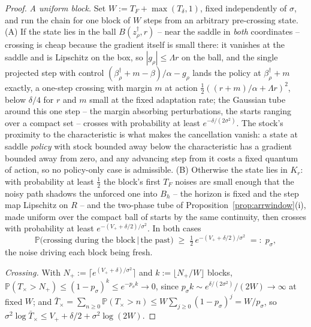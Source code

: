 \documentclass[11pt]{article}
\theoremstyle{definition}
\theoremstyle{remark}
\numberwithin{equation}{section}
\begin{document}
\begin{proof}
\emph{A uniform block.} Set $W := T_F + \max(T_\delta, 1)$, fixed independently of $\sigma$, and run the chain for one block of $W$ steps from an arbitrary pre-crossing state. (A) If the state lies in the ball $B(z^\dagger_\rho, r)$ -- near the saddle in \emph{both} coordinates -- crossing is cheap because the gradient itself is small there: it vanishes at the saddle and is Lipschitz on the box, so $|g_\rho| \le \Lambda r$ on the ball, and the single projected step with control $(\beta^\dagger_\rho + m - \beta)/\alpha - g_\rho$ lands the policy at $\beta^\dagger_\rho + m$ exactly, a one-step crossing with margin $m$ at action $\tfrac12((r+m)/\alpha + \Lambda r)^2$, below $\delta/4$ for $r$ and $m$ small at the fixed adaptation rate; the Gaussian tube around this one step -- the margin absorbing perturbations, the starts ranging over a compact set -- crosses with probability at least $e^{-\delta/(2\sigma^2)}$. The stock's proximity to the characteristic is what makes the cancellation vanish: a state at saddle \emph{policy} with stock bounded away below the characteristic has a gradient bounded away from zero, and any advancing step from it costs a fixed quantum of action, so no policy-only case is admissible. (B) Otherwise the state lies in $K_r$: with probability at least $\tfrac12$ the block's first $T_F$ noises are small enough that the noisy path shadows the unforced one into $B_h$ -- the horizon is fixed and the step map Lipschitz on $R$ -- and the two-phase tube of Proposition~\ref{prop:arrwindow}(i), made uniform over the compact ball of starts by the same continuity, then crosses with probability at least $e^{-(V_+ + \delta/2)/\sigma^2}$. In both cases
\[
\mathbb{P}\bigl(\text{crossing during the block} \,\big|\, \text{the past}\bigr) \;\ge\; \tfrac12\, e^{-(V_+ + \delta/2)/\sigma^2} \;=:\; p_\sigma ,
\]
the noise driving each block being fresh.

\emph{Crossing.} With $N_+ := \lceil e^{(V_+ + \delta)/\sigma^2}\rceil$ and $k := \lfloor N_+/W \rfloor$ blocks, $\mathbb{P}(T_{\times} > N_+) \le (1-p_\sigma)^{k} \le e^{-p_\sigma k} \to 0$, since $p_\sigma k \sim e^{\delta/(2\sigma^2)}/(2W) \to \infty$ at fixed $W$; and $\bar T_{\times} = \sum_{n \ge 0} \mathbb{P}(T_{\times} > n) \le W \sum_{j\ge0}(1-p_\sigma)^j = W/p_\sigma$, so $\sigma^2 \log \bar T_{\times} \le V_+ + \delta/2 + \sigma^2\log(2W)$.


\end{proof}
\end{document}
